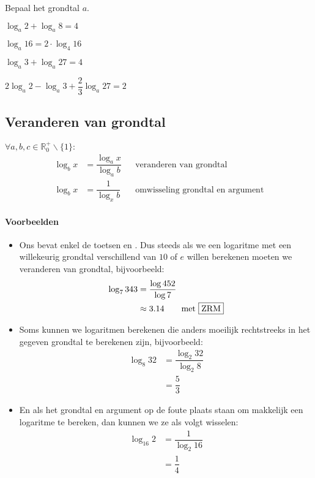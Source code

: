\documentclass[12pt,twoside]{article}
\begin{document}
\begin{oefening} %
Bepaal het grondtal $a$.
\begin{exlist}{2}
  \item $\log_a 2 + \log_a 8 = 4$
  \item $\log_a 16 = 2\cdot \log_4 16$
  \item $\log_a 3 + \log_a 27 = 4$
  \item $2 \log_a 2 - \log_a 3 + \dfrac{2}{3}\log_a 27 = 2$  
\end{exlist}
\end{oefening}

\pagebreak
\subsection{Veranderen van grondtal}

\begin{mdframed}
$\forall a,b,c \in \mathbb{R}_0^+\backslash\{1\}:$
\begin{align*}
\log_b x &= \dfrac{\log_a x}{\log_a b} && \mbox{veranderen van grondtal}\\
\log_b x &= \dfrac{1}{\log_x b} && \mbox{omwisseling grondtal en argument}
\end{align*}
\end{mdframed}

\paragraph*{Voorbeelden}
\begin{itemize}
  \item Ons  bevat enkel de toetsen  en . Dus steeds als we een logaritme met een willekeurig grondtal verschillend van $10$ of $e$ willen berekenen moeten we veranderen van grondtal, bijvoorbeeld:
  \begin{align*}
    \log_{7}343 &= \dfrac{\log 452}{\log 7}\\
                &\approx 3.14 \qquad\mbox{met \zrm{ZRM}} 
  \end{align*}
  \item Soms kunnen we logaritmen berekenen die anders moeilijk rechtstreeks in het gegeven grondtal te berekenen zijn, bijvoorbeeld:
  \begin{align*}
    \log_{8}32 &= \dfrac{\log_2 32}{\log_2 8}\\
               &= \dfrac{5}{3} 
  \end{align*}
  \item En als het grondtal en argument op de foute plaats staan om makkelijk een logaritme te bereken, dan kunnen we ze als volgt wisselen:
  \begin{align*}
    \log_{16}2 &= \dfrac{1}{\log_2 16}\\
               &= \dfrac{1}{4}
  \end{align*}
\end{itemize}
\end{document}
